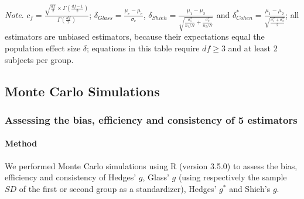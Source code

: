 \documentclass[
  english,
  man,floatsintext]{apa6}
\let\oldparagraph\paragraph
\renewcommand{\paragraph}[1]{\oldparagraph{#1}\mbox{}}
\begin{document}
\begin{landscape}
\emph{Note}. \(c_f=\frac{\sqrt{\frac{df}{2}} \times \Gamma\left( \frac{df-1}{2}\right)}{\Gamma\left( \frac{df}{2}\right)}\); \(\delta_{Glass}=\frac{\mu_c-\mu_e}{\sigma_c}\), \(\delta_{Shieh}=\frac{\mu_1-\mu_2}{\sqrt{\frac{\sigma^2_1}{n_1/N}+\frac{\sigma^2_2}{n_2/N}}}\) and \(\delta^*_{Cohen}=\frac{\mu_1-\mu_2}{\sqrt{\frac{\sigma^2_1+\sigma^2_2}{2}}}\); all estimators are unbiased estimators, because their expectations equal the population effect size \(\delta\); equations in this table require \(df \ge 3\) and at least 2 subjects per group.

\end{landscape}
\newpage

\hypertarget{monte-carlo-simulations}{%
\subsection{Monte Carlo Simulations}\label{monte-carlo-simulations}}

\hypertarget{assessing-the-bias-efficiency-and-consistency-of-5-estimators}{%
\subsubsection{Assessing the bias, efficiency and consistency of 5 estimators}\label{assessing-the-bias-efficiency-and-consistency-of-5-estimators}}

\hypertarget{method}{%
\paragraph{Method}\label{method}}

We performed Monte Carlo simulations using R (version 3.5.0) to assess the bias, efficiency and consistency of Hedges' \(g\), Glass' \(g\) (using respectively the sample \(SD\) of the first or second group as a standardizer), Hedges' \(g^*\) and Shieh's \(g\).
\end{document}

